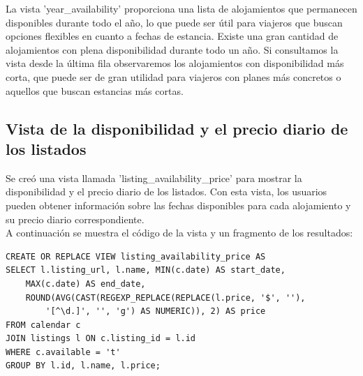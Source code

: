 La vista 'year\_availability' proporciona una lista de alojamientos que permanecen disponibles durante todo el año, lo que puede ser útil para viajeros que buscan opciones flexibles en cuanto a fechas de estancia. Existe una gran cantidad de alojamientos con plena disponibilidad durante todo un año. Si consultamos la vista desde la última fila observaremos los alojamientos con disponibilidad más corta, que puede ser de gran utilidad para viajeros con planes más concretos o aquellos que buscan estancias más cortas.

\subsection{Vista de la disponibilidad y el precio diario de los listados}

Se creó una vista llamada 'listing\_availability\_price' para mostrar la disponibilidad y el precio diario de los listados. Con esta vista, los usuarios pueden obtener información sobre las fechas disponibles para cada alojamiento y su precio diario correspondiente. \\
A continuación se muestra el código de la vista y un fragmento de los resultados:

\begin{verbatim}
CREATE OR REPLACE VIEW listing_availability_price AS
SELECT l.listing_url, l.name, MIN(c.date) AS start_date, 
    MAX(c.date) AS end_date,
    ROUND(AVG(CAST(REGEXP_REPLACE(REPLACE(l.price, '$', ''),
        '[^\d.]', '', 'g') AS NUMERIC)), 2) AS price
FROM calendar c
JOIN listings l ON c.listing_id = l.id
WHERE c.available = 't'
GROUP BY l.id, l.name, l.price;
\end{verbatim}


